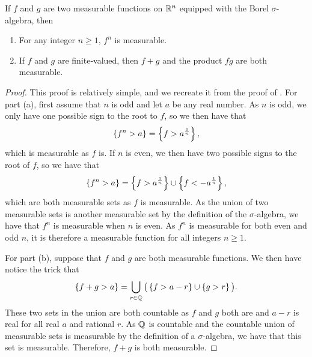 \begin{proposition}\label{lbl_prop_addition_measurable_functions_measurable}
  If $f$ and $g$ are two measurable functions on $\mathbb{R}^n$ equipped with the Borel $\sigma$-algebra, then
  \begin{enumerate}[label=(\alph*)]
    \item For any integer $n \geq 1$, $f^n$ is measurable.
    \item If $f$ and $g$ are finite-valued, then $f+g$ and the product $fg$ are both measurable.
  \end{enumerate}
\end{proposition}
\begin{proof}
  This proof is relatively simple, and we recreate it from the proof of {\cite[Property 5, p.29]{stein}}. For part (a), first assume that $n$ is odd and let $a$ be any real number. As $n$ is odd, we only have one possible sign to the root to $f$, so we then have that
  \begin{equation*}
    \left\{f^n > a\right\} = \left\{f > a^{\frac{1}{n}}\right\},
  \end{equation*}
  which is measurable as $f$ is. If $n$ is even, we then have two possible signs to the root of $f$, so we have that
  \begin{equation*}
    \left\{f^n > a\right\} = \left\{f > a^\frac{1}{n}\right\} \cup \left\{f < -a^{\frac{1}{n}}\right\},
  \end{equation*}
  which are both measurable sets as $f$ is measurable. As the union of two measurable sets is another measurable set by the definition of the $\sigma$-algebra, we have that $f^n$ is measurable when $n$ is even. As $f^n$ is measurable for both even and odd $n$, it is therefore a measurable function for all integers $n \geq 1$.

  \medskip

  For part (b), suppose that $f$ and $g$ are both measurable functions. We then have notice the trick that
  \begin{equation*}
    \left\{f + g > a\right\}
    =
    \bigcup_{r \in \mathbb{Q}} \big( \left\{f > a - r\right\} \cup \left\{g > r\right\} \big).
  \end{equation*}
  These two sets in the union are both countable as $f$ and $g$ both are and $a - r$ is real for all real $a$ and rational $r$. As $\mathbb{Q}$ is countable and the countable union of measurable sets is measurable by the definition of a $\sigma$-algebra, we have that this set is measurable. Therefore, $f+g$ is both measurable.

  \medskip


\end{proof}
